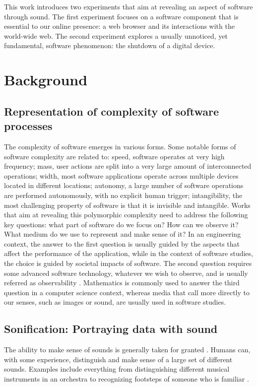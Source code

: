 \documentclass[manuscript,screen]{acmart}
\newcommand{\todo}[1]{{\color{red} TODO: #1}}
\begin{document}
This work introduces two experiments that aim at revealing an aspect of software through sound. The first experiment focuses on a software component that is essential to our online presence: a web browser and its interactions with the world-wide web. The second experiment explores a usually unnoticed, yet fundamental, software phenomenon: the shutdown of a digital device. 

\section{Background}
\subsection{Representation of complexity of software processes}

The complexity of software emerges in various forms. Some notable forms of software complexity are related to: speed,  software operates at very high frequency; mass, user actions are split into a very large amount of interconnected operations; width, most software applications operate across multiple devices located in different locations; autonomy, a large number of software operations are performed autonomously, with no explicit human trigger; intangibility, the most challenging property of software is that it is invisible and intangible. Works that aim at revealing this polymorphic complexity need to address the following key questions: what part of software do we focus on? How can we observe it? What medium do we use to represent and make sense of it? In an engineering context, the answer to the first question is usually  guided by the aspects that affect the performance of the application, while in the context of software studies, the choice is guided by societal impacts of software. The second question requires some advanced software technology, whatever we wish to observe, and is usually referred as observability \cite{Sridharan18}. Mathematics is commonly used to answer the third question in a computer science context, whereas media that call more directly to our senses, such as images or sound, are usually used in software studies.

\subsection{Sonification: Portraying data with sound}
The ability to make sense of sounds is generally taken for granted \cite{mcadams1993}. Humans can, with some experience, distinguish and make sense of a large set of different sounds. Examples include everything from distinguishing different musical instruments in an orchestra to recognizing footsteps of someone who is familiar \cite{mcadams1993}. 
\end{document}
